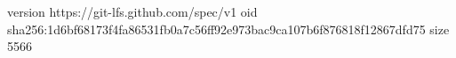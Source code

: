 version https://git-lfs.github.com/spec/v1
oid sha256:1d6bf68173f4fa86531fb0a7c56ff92e973bac9ca107b6f876818f12867dfd75
size 5566
